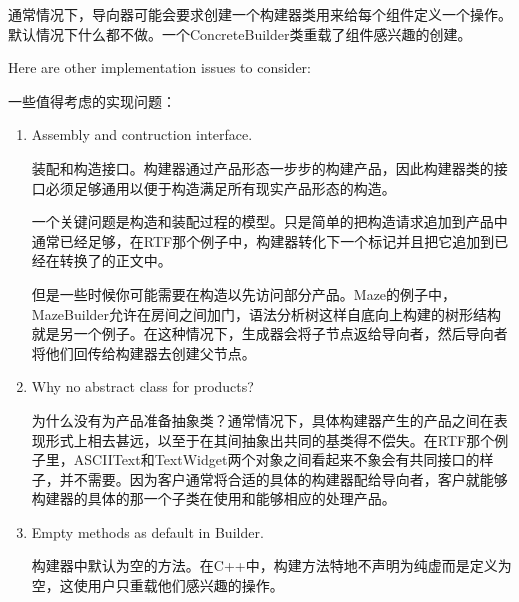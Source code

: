 通常情况下，导向器可能会要求创建一个构建器类用来给每个组件定义一个操作。默认情况下什么都不做。一个ConcreteBuilder类重载了组件感兴趣的创建。

Here are other implementation issues to consider:

一些值得考虑的实现问题：

\begin{enumerate}

\item Assembly and contruction interface.

	  装配和构造接口。构建器通过产品形态一步步的构建产品，因此构建器类的接口必须足够通用以便于构造满足所有现实产品形态的构造。

	  一个关键问题是构造和装配过程的模型。只是简单的把构造请求追加到产品中通常已经足够，在RTF那个例子中，构建器转化下一个标记并且把它追加到已经在转换了的正文中。

	  但是一些时候你可能需要在构造以先访问部分产品。Maze的例子中，MazeBuilder允许在房间之间加门，语法分析树这样自底向上构建的树形结构就是另一个例子。在这种情况下，生成器会将子节点返给导向者，然后导向者将他们回传给构建器去创建父节点。

\item Why no abstract class for products?

	  为什么没有为产品准备抽象类？通常情况下，具体构建器产生的产品之间在表现形式上相去甚远，以至于在其间抽象出共同的基类得不偿失。在RTF那个例子里，ASCIIText和TextWidget两个对象之间看起来不象会有共同接口的样子，并不需要。因为客户通常将合适的具体的构建器配给导向者，客户就能够构建器的具体的那一个子类在使用和能够相应的处理产品。

\item Empty methods as default in Builder.

      构建器中默认为空的方法。在C++中，构建方法特地不声明为纯虚而是定义为空，这使用户只重载他们感兴趣的操作。

\end{enumerate}
